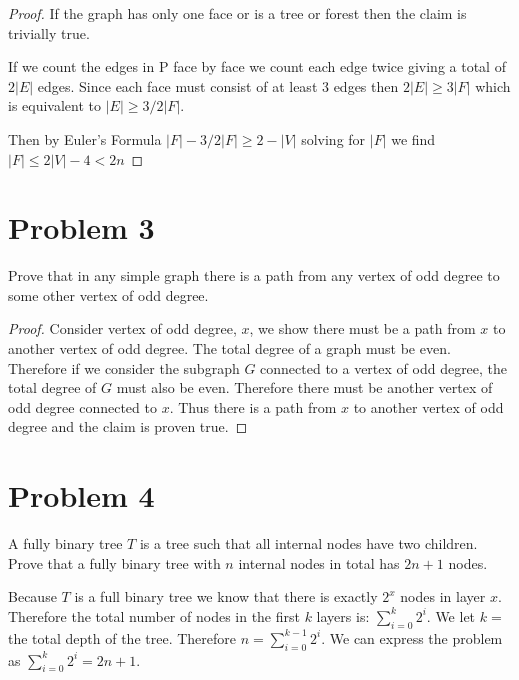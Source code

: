 \documentclass[11pt]{article}
\begin{document}
\begin{proof}
If the graph has only one face or is a tree or forest then the claim is trivially true. 

If we count the edges in P face by face we count each edge twice giving a total of $2 |E|$ edges. Since each face must consist of at least 3 edges then $2|E| \geq 3 |F|$ which is equivalent to $|E| \geq 3/2 |F|$. 

Then by Euler's Formula $|F| - 3/2 |F| \geq 2 - |V|$ solving for $|F|$ we find $|F| \leq 2 |V| - 4 < 2n$
\end{proof}

\newpage
\section*{Problem 3}

Prove that in any simple graph there is a path from any vertex of odd degree
to some other vertex of odd degree.
\newline

\begin{proof}

Consider vertex of odd degree, $x$, we show there must be a path from $x$ to another vertex of odd degree. The total degree of a graph must be even. Therefore if we consider the subgraph $G$ connected to a vertex of odd degree, the total degree of $G$ must also be even. Therefore there must be another vertex of odd degree connected to $x$. Thus there is a path from $x$ to another vertex of odd degree and the claim is proven true. 

\end{proof}

\newpage
\section*{Problem 4}

A fully binary tree $T$ is a tree such that all internal nodes have
two children. Prove that a fully binary tree with $n$ internal nodes
in total has $2n+1$ nodes.
\newline

Because $T$ is a full binary tree we know that there is exactly $2^x$ nodes in layer $x$. Therefore the total number of nodes in the first $k$ layers is: $\sum _{i = 0}^{k} 2^i$. We let $k = $ the total depth of the tree. Therefore $n = \sum _{i = 0}^{k-1} 2^i$. We can express the problem as $\sum _{i = 0}^{k} 2^i = 2n + 1$. 
\newline
\end{document}
